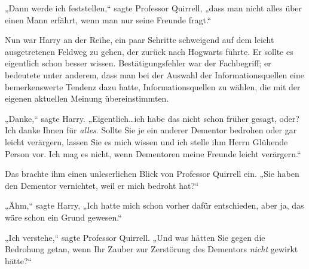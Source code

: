„Dann werde ich feststellen,“ sagte Professor Quirrell, „dass man nicht alles über einen Mann erfährt, wenn man nur seine Freunde fragt.“

Nun war Harry an der Reihe, ein paar Schritte schweigend auf dem leicht ausgetretenen Feldweg zu gehen, der zurück nach Hogwarts führte. Er sollte es eigentlich schon besser wissen. Bestätigungsfehler war der Fachbegriff; er bedeutete unter anderem, dass man bei der Auswahl der Informationsquellen eine bemerkenswerte Tendenz dazu hatte, Informationsquellen zu wählen, die mit der eigenen aktuellen Meinung übereinstimmten.%

„Danke,“ sagte Harry. „Eigentlich…ich habe das nicht schon früher gesagt, oder? Ich danke Ihnen für \emph{alles}. Sollte Sie je ein anderer Dementor bedrohen oder gar leicht verärgern, lassen Sie es mich wissen und ich stelle ihm Herrn Glühende Person vor. Ich mag es nicht, wenn Dementoren meine Freunde leicht verärgern.“

Das brachte ihm einen unleserlichen Blick von Professor Quirrell ein. „Sie haben den Dementor vernichtet, weil er mich bedroht hat?“

„Ähm,“ sagte Harry, „Ich hatte mich schon vorher dafür entschieden, aber ja, das wäre schon ein Grund gewesen.“

„Ich verstehe,“ sagte Professor Quirrell. „Und was hätten Sie gegen die Bedrohung getan, wenn Ihr Zauber zur Zerstörung des Dementors \emph{nicht} gewirkt hätte?“

